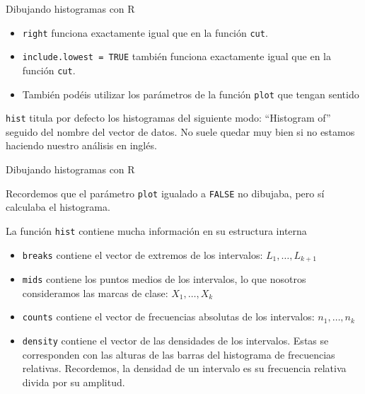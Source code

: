 \documentclass[
  ignorenonframetext,
]{beamer}
\providecommand{\tightlist}{%
  \setlength{\itemsep}{0pt}\setlength{\parskip}{0pt}}
\begin{document}
\begin{frame}[fragile]{Dibujando histogramas con R}
\protect\hypertarget{dibujando-histogramas-con-r-1}{}

\begin{itemize}
\tightlist
\item
  \texttt{right} funciona exactamente igual que en la función
  \texttt{cut}.
\item
  \texttt{include.lowest\ =\ TRUE} también funciona exactamente igual
  que en la función \texttt{cut}.
\item
  También podéis utilizar los parámetros de la función \texttt{plot} que
  tengan sentido
\end{itemize}

\texttt{hist} titula por defecto los histogramas del siguiente modo:
``Histogram of'' seguido del nombre del vector de datos. No suele quedar
muy bien si no estamos haciendo nuestro análisis en inglés.

\end{frame}

\begin{frame}[fragile]{Dibujando histogramas con R}
\protect\hypertarget{dibujando-histogramas-con-r-2}{}

Recordemos que el parámetro \texttt{plot} igualado a \texttt{FALSE} no
dibujaba, pero sí calculaba el histograma.

La función \texttt{hist} contiene mucha información en su estructura
interna

\begin{itemize}
\tightlist
\item
  \texttt{breaks} contiene el vector de extremos de los intervalos:
  \(L_1,\dots,L_{k+1}\)
\item
  \texttt{mids} contiene los puntos medios de los intervalos, lo que
  nosotros consideramos las marcas de clase: \(X_1,\dots,X_k\)
\item
  \texttt{counts} contiene el vector de frecuencias absolutas de los
  intervalos: \(n_1,\dots,n_k\)
\item
  \texttt{density} contiene el vector de las densidades de los
  intervalos. Estas se corresponden con las alturas de las barras del
  histograma de frecuencias relativas. Recordemos, la densidad de un
  intervalo es su frecuencia relativa divida por su amplitud.
\end{itemize}

\end{frame}
\end{document}
